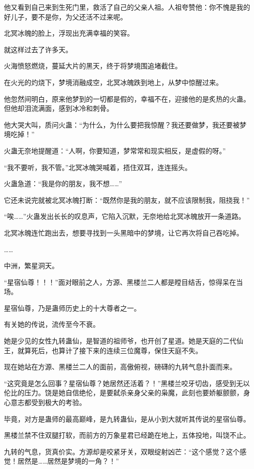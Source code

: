 \begin{this_body}
他又看到自己来到生死门里，救活了自己的父亲人祖。人祖夸赞他：你不愧是我的好儿子，要不是你，为父还活不过来呢。

北冥冰魄的脸上，浮现出充满幸福的笑容。

就这样过去了许多天。

火海愤怒燃烧，蔓延大片的黑天，终于将梦境围追堵截住。

在火光的灼烧下，梦境消融成空，北冥冰魄跌到地上，从梦中惊醒过来。

他忽然间明白，原来他梦到的一切都是假的，幸福不在，迎接他的是炙热的火蛊。但他却泪流满面，感到冰冷和刺骨。

他大哭大叫，质问火蛊：“为什么，为什么要把我惊醒？我还要做梦，我还要被梦境吃掉！”

火蛊无奈地提醒道：“人啊，你要知道，梦常常和现实相反，是虚假的呀。”

“我不要听，我不管。”北冥冰魄哭喊着，捂住双耳，连连摇头。

火蛊急道：“我是你的朋友，我不想……”

它还未说完就被北冥冰魄打断：“既然你是我的朋友，就不应该限制我，阻挠我！”

“唉……”火蛊发出长长的叹息声，它陷入沉默，无奈地给北冥冰魄放开一条道路。

北冥冰魄连忙跑出去，想要寻找到一头黑暗中的梦境，让它再次将自己吞吃掉。

……

中洲，繁星洞天。

“星宿仙尊！！！”面对眼前之人，方源、黑楼兰二人都是瞠目结舌，惊得呆在当场。

星宿仙尊，乃是蛊师历史上的十大尊者之一。

有关她的传说，流传至今不衰。

她是少见的女性九转蛊仙，是智道的祖师爷，也开创了星道。她是天庭的二代仙王，就算死后，也算计了接下来的连续三位魔尊，保住天庭不失。

现在她站在方源、黑楼兰二人的面前，高傲俯视，磅礴的九转气息扑面而来。

“这究竟是怎么回事？星宿仙尊？她居然还活着？！”黑楼兰咬牙切齿，感受到无以伦比的压力。饶是她自信绝伦，是要弑杀亲身父亲的枭魔，此刻也要娇躯颤颤，身心意志都受到极大的考验。

毕竟，对方是蛊师的最高巅峰，是九转蛊仙，是从小到大就听其传说的星宿仙尊。

黑楼兰禁不住双腿打软，而前方的万象星君已经跪在地上，五体投地，叫饶不止。

九转的气息，货真价实。方源却是咬紧牙关，双眼绽射凶芒：“这个感觉？这个感觉！居然是……居然是梦境的一角？！”


\end{this_body}
